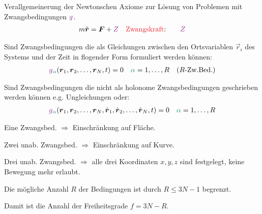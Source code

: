 \begin{sectionbox} \nospacing
 Verallgemeinerung der Newtonschen Axiome zur Lösung von Problemen mit Zwangsbedingungen $\gz$.
 \begin{align}\label{eq:lagr1}
   m\ddot{\vec{r}}&=\vec{F}+\Zw & \text{\rd{Zwangskraft}:}\qquad \Zw
 \end{align}
\end{sectionbox}
\begin{defnbox}\nospacing
  \begin{defn}
    Sind Zwangsbedingungen die als Gleichungen zwischen den
    Ortsvariablen $\vec{r}_i$ des Systems und der Zeit in flogender Form formuliert werden können:
    \begin{align*}
      \gz_{\alphac}(\rv_1,\rv_2,\ldots,\rv_N,t)&=0 &\alphac=1,\ldots,R &&(R\text{-Zw.Bed.})
    \end{align*}
  \end{defn}
\end{defnbox}
\begin{defnbox}\nospacing
  \begin{defn}
    Sind Zwangsbedingungen die nicht als holonome Zwangsbedingungen geschrieben werden können
    e.g. Ungleichungen oder:
    \begin{align*}
      \gz_{\alphac}(\rv_1,\rv_2,\ldots,\rv_N,\dot{\rv}_1,\dot{\rv}_2,\ldots,\dot{\rv}_N,t)&=0 &\alphac=1,\ldots,R 
    \end{align*}
  \end{defn}
\end{defnbox}
\begin{notebox}
  \begin{numberlist}
      \item Eine Zwangsbed. $\Rightarrow$ Einschränkung auf Fläche.
      \item Zwei unab. Zwangsbed. $\Rightarrow$ Einschränkung auf Kurve.
      \item Drei unab. Zwangsbed. $\Rightarrow$ alle drei Koordinaten $x,y,z$ sind festgelegt, keine Bewegung mehr erlaubt.
  \end{numberlist}
\end{notebox}
\begin{notebox}
  \begin{numberlist}
    \item Die mögliche Anzahl $R$ der Bedingungen ist durch $R\leq3N-1$ begrenzt.
    \item Damit ist die Anzahl der Freiheitsgrade $f=3N-R$.
  \end{numberlist}
\end{notebox}
